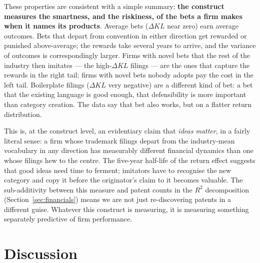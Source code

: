\documentclass[11pt]{article}
\begin{document}
These properties are consistent with a simple summary: \textbf{the
construct measures the smartness, and the riskiness, of the bets a
firm makes when it names its products}. Average bets ($\Delta KL$
near zero) earn average outcomes. Bets that depart from convention
in either direction get rewarded or punished above-average; the
rewards take several years to arrive, and the variance of outcomes
is correspondingly larger. Firms with novel bets that the rest of
the industry then imitates --- the high-$\Delta KL$ filings ---
are the ones that capture the rewards in the right tail; firms
with novel bets nobody adopts pay the cost in the left tail.
Boilerplate filings ($\Delta KL$ very negative) are a different
kind of bet: a bet that the existing language is good enough,
that defensibility is more important than category creation. The
data say that bet also works, but on a flatter return distribution.

This is, at the construct level, an evidentiary claim that
\emph{ideas matter}, in a fairly literal sense: a firm whose
trademark filings depart from the industry-mean vocabulary in any
direction has measurably different financial dynamics than one
whose filings hew to the centre. The five-year half-life of the
return effect suggests that good ideas need time to ferment;
imitators have to recognise the new category and copy it before
the originator's claim to it becomes valuable. The sub-additivity
between this measure and patent counts in the $R^2$ decomposition
(Section~\ref{sec:financials}) means we are not just re-discovering
patents in a different guise. Whatever this construct is measuring,
it is measuring something separately predictive of firm
performance.

\section{Discussion}
\end{document}
